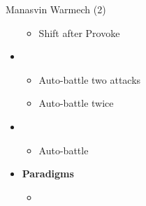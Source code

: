 \begin{battle}{Manasvin Warmech (2)}
\begin{itemize}
\begin{itemize}
        \item Shift after Provoke
    \end{itemize}
    \item \third
    \begin{itemize}
        \item Auto-battle two attacks
        \item Auto-battle twice
    \end{itemize}
    \item \fourth
    \begin{itemize}
        \item Auto-battle
    \end{itemize}
\end{itemize}
\end{battle}

\begin{menu}
\begin{itemize}
    \item \textbf{Paradigms}
    \begin{itemize}
        \item {}%
{\paradigmline[1]{\textit{\com}}{\textit{\rav}}{\textit{\rav}}}%
{\paradigmline{\com}{\med}{\rav}}%
{\paradigmline{[\rav]}{\rav}{\rav}}%
{\paradigmline{[\rav]}{\rav}{\rav}}%
{\paradigmline{[\com]}{\rav}{\rav}}
    \end{itemize}
\end{itemize}
\end{menu}

\renewcommand{\first}{[1] Relentless Assault (\com/\rav/\rav)}
\renewcommand{\second}{[2] Diversity (\com/\med/\rav)}
\renewcommand{\third}{[3] Tri-Disaster (\rav/\rav/\rav)}
\renewcommand{\fourth}{[4] Tri-Disaster (\rav/\rav/\rav)}
\renewcommand{\fifth}{[5] Relentless Assault (\com/\rav/\rav)}


